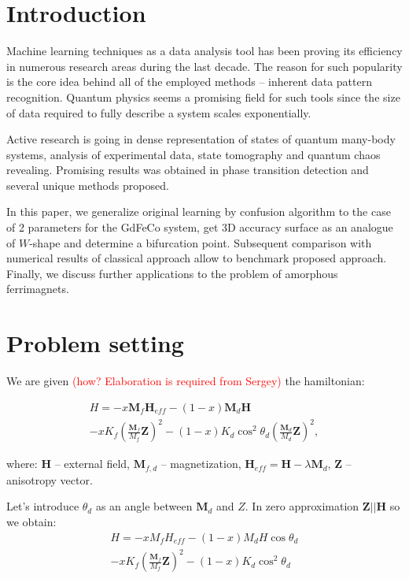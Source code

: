 \section{Introduction}

Machine learning techniques as a data analysis tool has been proving its efficiency in numerous research areas during the last decade.
The reason for such popularity is the core idea behind all of the employed methods -- inherent data pattern recognition.
Quantum physics seems a promising field for such tools since the size of data required to fully describe a system scales exponentially.

Active research is going in dense representation of states of quantum many-body systems, analysis of experimental data, state tomography and quantum chaos revealing.
Promising results was obtained in phase transition detection and several unique methods proposed.

In this paper, we generalize original learning by confusion algorithm to the case of 2 parameters for the GdFeCo system, get 3D accuracy surface as an analogue of $W$-shape and determine a bifurcation point.
Subsequent comparison with numerical results of classical approach allow to benchmark proposed approach.
Finally, we discuss further applications to the problem of amorphous ferrimagnets.

\section{Problem setting}

We are given \textcolor{red}{(how? Elaboration is required from Sergey)} the hamiltonian:

\begin{multline}
    H =
    -x\bm{M}_f\bm{H}_{eff}
    -(1-x)\bm{M}_d\bm{H}\\
    - xK_f\left(\frac{\bm{M}_f}{M_f}\bm{Z}\right)^2
    -(1-x)K_d\cos^2\theta_d\left(\frac{\bm{M}_d}{M_d}\bm{Z}\right)^2,
\end{multline}

where:
$\bm{H}$ -- external field,
$\bm{M}_{f,d}$ -- magnetization,
$\bm{H}_{eff} = \bm{H} - \lambda\bm{M}_d$,
$\bm{Z}$ -- anisotropy vector.

Let's introduce $\theta_d$ as an angle between $\bm{M}_d$ and $Z$.
In zero approximation $\bm{Z} || \bm{H}$ so we obtain:
\begin{multline}
    H =
    -xM_f H_{eff}-(1-x)M_d H\cos\theta_d\\
    - xK_f\left(\frac{\bm{M}_f}{M_f}\bm{Z}\right)^2
    -(1-x)K_d\cos^2\theta_d
\end{multline}

